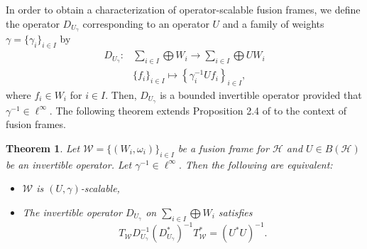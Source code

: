 \documentclass[sn-mathphys-num]{sn-jnl}%
\newtheorem{theorem}{Theorem}[section]
\theoremstyle{definition}
\theoremstyle{remark}
\numberwithin{equation}{section}
\begin{document}
In order to obtain a characterization of operator-scalable fusion frames, we define the operator $D_{U_{\gamma}}$ corresponding to an operator $U$ and a family of weights $\gamma=\{\gamma_{i}\}_{i \in I}$ by
\begin{align*}
D_{U_{\gamma}}:&\sum_{i \in I}\bigoplus W_{i} \rightarrow \sum_{i \in I}\bigoplus UW_{i}
\\&\{f_{i}\}_{i\in I}\mapsto \left\lbrace \gamma_{i}^{-1}Uf_{i}\right\rbrace _{i\in I},
\end{align*}
where $f_{i}\in W_{i}$ for $i\in I$. Then, $D_{U_{\gamma}}$ is a bounded invertible operator provided that $\gamma^{-1} \in \ell^{\infty}.$ The following theorem extends Proposition 2.4 of \cite{Gitta 13} to the context of fusion frames.
\begin{theorem}\label{frame operator D}
Let $\mathcal{W}=\{(W_{i},\omega_{i})\}_{i \in I} $ be a fusion frame for $\mathcal {H}$ and $U\in B(\mathcal{H})$ be an invertible operator. Let $\gamma^{-1} \in \ell^{\infty}.$ Then the following are equivalent:
\begin{itemize}
\item[$(i)$] $\mathcal{W}$ is $(U,\gamma)$-scalable, 
\item[$(ii)$] The invertible operator $D_{U_{\gamma}}$ on $\sum_{i \in I}\bigoplus W_{i}$ satisfies
\begin{equation}\label{DU}
T_{\mathcal{W}}D_{U_{\gamma}}^{-1}\left( D_{U_{\gamma}}^{*}\right) ^{-1}T_{\mathcal{W}}^{*}=(U^{*}U)^{-1}.
\end{equation}
\end{itemize}
\end{theorem}
\end{document}
